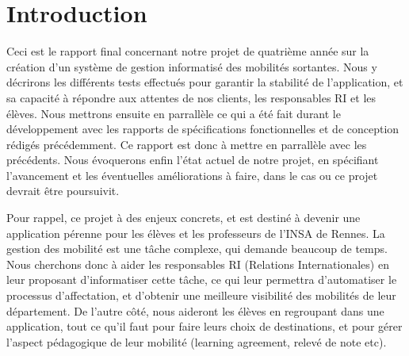\chapter{Introduction}

Ceci est le rapport final concernant notre projet de quatrième année sur la création d'un système de gestion informatisé des mobilités sortantes. Nous y décrirons les différents tests effectués pour garantir la stabilité de l'application, et sa capacité à répondre aux attentes de nos clients, les responsables RI et les élèves. Nous mettrons ensuite en parrallèle ce qui a été fait durant le développement avec les rapports de spécifications fonctionnelles et de conception rédigés précédemment. Ce rapport est donc à mettre en parrallèle avec les précédents. Nous évoquerons enfin l'état actuel de notre projet, en spécifiant l'avancement et les éventuelles améliorations à faire, dans le cas ou ce projet devrait être poursuivit.

\smallbreak

Pour rappel, ce projet à des enjeux concrets, et est destiné à devenir une application pérenne pour les élèves et les professeurs de l'INSA de Rennes. La gestion des mobilité est une tâche complexe, qui demande beaucoup de temps. Nous cherchons donc à aider les responsables RI (Relations Internationales) en leur proposant d'informatiser cette tâche, ce qui leur permettra d'automatiser le processus d'affectation, et d'obtenir une meilleure visibilité des mobilités de leur département. De l'autre côté, nous aideront les élèves en regroupant dans une application, tout ce qu'il faut pour faire leurs choix de destinations, et pour gérer l'aspect pédagogique de leur mobilité (learning agreement, relevé de note etc).
